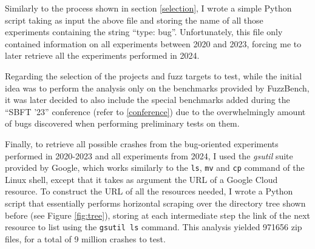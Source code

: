 Similarly to the process shown in section \ref{selection}, I wrote a simple Python script taking as input the above file and storing the name of all those experiments containing the string ``type: bug''. Unfortunately, this file only contained information on all experiments between 2020 and 2023, forcing me to later retrieve all the experiments performed in 2024.

Regarding the selection of the projects and fuzz targets to test, while the initial idea was to perform the analysis only on the benchmarks provided by FuzzBench, it was later decided to also include the special benchmarks added during the ``SBFT '23'' conference (refer to \ref{conference}) due to the overwhelmingly amount of bugs discovered when performing preliminary tests on them.

Finally, to retrieve all possible crashes from the bug-oriented experiments performed in 2020-2023 and all experiments from 2024, I used the \textit{gsutil} suite provided by Google, which works similarly to the \verb|ls|, \verb|mv| and \verb|cp| command of the Linux shell, except that it takes as argument the URL of a Google Cloud resource. To construct the URL of all the resources needed, I wrote a Python script that essentially performs horizontal scraping over the directory tree shown before (see Figure \ref{fig:tree}), storing at each intermediate step the link of the next resource to list using the \verb|gsutil ls| command. This analysis yielded 971656 zip files, for a total of 9 million crashes to test.
\newline

